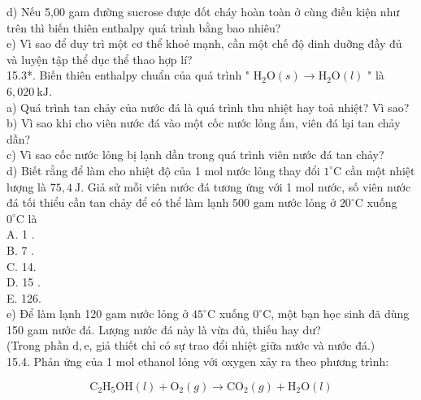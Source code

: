 \documentclass[10pt]{article}
\begin{document}
\begin{enumerate}
d) Nếu 5,00 gam đường sucrose được đốt cháy hoàn toàn ở cùng điều kiện như trên thì biến thiên enthalpy quá trình bằng bao nhiêu?\\
e) Vì sao để duy trì một cơ thể khoẻ mạnh, cần một chế độ dinh duỡng đầy đủ và luyện tập thể dục thể thao hợp lí?\\
15.3*. Biến thiên enthalpy chuẩn của quá trình " $\mathrm{H}_{2} \mathrm{O}(s) \rightarrow \mathrm{H}_{2} \mathrm{O}(l)$ " là $6,020 \mathrm{~kJ}$.\\
a) Quá trình tan chảy của nước đá là quá trình thu nhiệt hay toả nhiệt? Vì sao?\\
b) Vì sao khi cho viên nước đá vào một cốc nước lỏng ấm, viên đá lại tan chảy dần?\\
c) Vì sao cốc nước lỏng bị lạnh dần trong quá trình viên nước đá tan chảy?\\
d) Biết rằng để làm cho nhiệt độ của 1 mol nước lỏng thay đổi $1^{\circ} \mathrm{C}$ cần một nhiệt lượng là $75,4 \mathrm{~J}$. Giả sử mỗi viên nước đá tương ứng với 1 mol nước, số viên nước đá tối thiểu cần tan chảy để có thể làm lạnh 500 gam nước lỏng ở $20^{\circ} \mathrm{C}$ xuống $0^{\circ} \mathrm{C}$ là\\
A. 1 .\\
B. 7 .\\
C. 14.\\
D. 15 .\\
E. 126.\\
e) Để làm lạnh 120 gam nước lỏng ở $45^{\circ} \mathrm{C}$ xuống $0^{\circ} \mathrm{C}$, một bạn học sinh đã dùng 150 gam nước đá. Lượng nước đá này là vừa đủ, thiếu hay dư?\\
(Trong phần $\mathrm{d}, \mathrm{e}$, giả thiết chỉ có sự trao đổi nhiệt giữa nước và nước đá.)\\
15.4. Phản ứng của 1 mol ethanol lỏng với oxygen xảy ra theo phương trình:
\end{enumerate}


\begin{equation*}
\mathrm{C}_{2} \mathrm{H}_{5} \mathrm{OH}(l)+\mathrm{O}_{2}(g) \rightarrow \mathrm{CO}_{2}(g)+\mathrm{H}_{2} \mathrm{O}(l) \tag{1}
\end{equation*}
\end{document}
